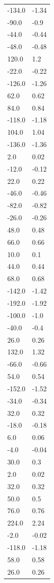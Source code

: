\begin{longtable}{ll}
-134.0 & -1.34 \\
-90.0 & -0.9 \\
-44.0 & -0.44 \\
-48.0 & -0.48 \\
120.0 & 1.2 \\
-22.0 & -0.22 \\
-126.0 & -1.26 \\
62.0 & 0.62 \\
84.0 & 0.84 \\
-118.0 & -1.18 \\
104.0 & 1.04 \\
-136.0 & -1.36 \\
2.0 & 0.02 \\
-12.0 & -0.12 \\
22.0 & 0.22 \\
-46.0 & -0.46 \\
-82.0 & -0.82 \\
-26.0 & -0.26 \\
48.0 & 0.48 \\
66.0 & 0.66 \\
10.0 & 0.1 \\
44.0 & 0.44 \\
68.0 & 0.68 \\
-142.0 & -1.42 \\
-192.0 & -1.92 \\
-100.0 & -1.0 \\
-40.0 & -0.4 \\
26.0 & 0.26 \\
132.0 & 1.32 \\
-66.0 & -0.66 \\
54.0 & 0.54 \\
-152.0 & -1.52 \\
-34.0 & -0.34 \\
32.0 & 0.32 \\
-18.0 & -0.18 \\
6.0 & 0.06 \\
-4.0 & -0.04 \\
30.0 & 0.3 \\
2.0 & 0.02 \\
32.0 & 0.32 \\
50.0 & 0.5 \\
76.0 & 0.76 \\
224.0 & 2.24 \\
-2.0 & -0.02 \\
-118.0 & -1.18 \\
58.0 & 0.58 \\
26.0 & 0.26 \\

\end{longtable}
